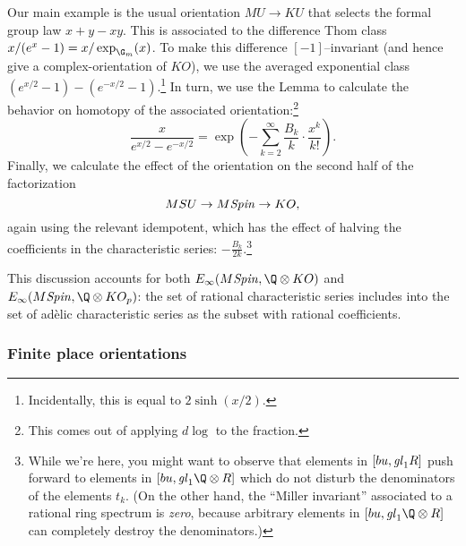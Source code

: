 Our main example is the usual orientation $MU \to KU$ that selects the formal group law $x + y - xy$.  This is associated to the difference Thom class $x / (e^x - 1) = x / \exp_{\G_m}(x)$.  To make this difference $[-1]$--invariant (and hence give a complex-orientation of $KO$), we use the averaged exponential class $(e^{x/2} - 1) - (e^{-x/2} - 1)$.\footnote{Incidentally, this is equal to $2\operatorname{sinh}(x/2)$.}  In turn, we use the Lemma to calculate the behavior on homotopy of the associated orientation:\footnote{This comes out of applying $d\log$ to the fraction.} \[\frac{x}{e^{x/2} - e^{-x/2}} = \exp\left(-\sum_{k=2}^\infty \frac{B_k}{k} \cdot \frac{x^k}{k!}\right).\]  Finally, we calculate the effect of the orientation on the second half of the factorization \[MSU \to M\mathit{Spin} \to KO,\] again using the relevant idempotent, which has the effect of halving the coefficients in the characteristic series: $-\frac{B_k}{2k}$.\footnote{While we're here, you might want to observe that elements in $[bu, \mathit{gl}_1 R]$ push forward to elements in $[bu, \gl_1 \Q \otimes R]$ which do not disturb the denominators of the elements $t_k$.  (On the other hand, the ``Miller invariant'' associated to a rational ring spectrum is \emph{zero}, because arbitrary elements in $[bu, \gl_1 \Q \otimes R]$ can completely destroy the denominators.)}

This discussion accounts for both $E_\infty(M\Spin, \Q \otimes KO)$ and $E_\infty(M\Spin, \Q \otimes KO_p)$: the set of rational characteristic series includes into the set of ad\`elic characteristic series as the subset with rational coefficients.




\subsubsection{Finite place orientations}\label{FinitePlaceOrientationsSubsection}

